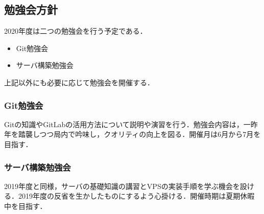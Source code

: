 \subsection*{勉強会方針}


2020年度は二つの勉強会を行う予定である．
 \begin{itemize}
\item Git勉強会
\item サーバ構築勉強会
 \end{itemize}
上記以外にも必要に応じて勉強会を開催する．

\subsubsection*{Git勉強会}
Gitの知識やGitLabの活用方法について説明や演習を行う．勉強会内容は，一昨年を踏襲しつつ局内で吟味し，クオリティの向上を図る．開催月は6月から7月を目指す．
\subsubsection*{サーバ構築勉強会}
2019年度と同様，サーバの基礎知識の講習とVPSの実装手順を学ぶ機会を設ける．2019年度の反省を生かしたものにするよう心掛ける．開催時期は夏期休暇中を目指す．


